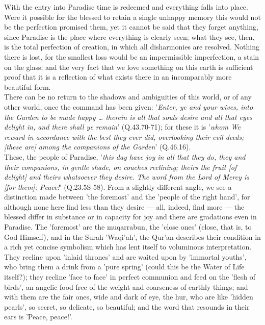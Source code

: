 \documentclass[11pt, b5paper, twoside]{book}
\begin{document}
With the entry into Paradise time is redeemed and everything falls into place. Were it possible for 
the blessed to retain a single unhappy memory this would not be the perfection promised them, yet it 
cannot be said that they forget anything, since Paradise is the place where everything is clearly 
seen; what they see, then, is the total perfection of creation, in which all disharmonies are 
resolved. Nothing there is lost, for the smallest loss would be an impermissible imperfection, a 
stain on the glass; and the very fact that we love something on this earth is sufficient proof that 
it is a reflection of what exists there in an incomparably more beautiful form. \\

There can be no return to the shadows and ambiguities of this world, or of any other world, once the 
command has been given: '\emph{Enter, ye and your wives, into the Garden to be made happy \ldots{} therein is 
all that souls desire and all that eyes delight in, and there shall ye remain}' (Q.43.70-71); for 
these it is '\emph{whom We reward in accordance with the best they ever did, overlooking their evil deeds; 
[these are] among the companions of the Garden}' (Q.46.16). \\

These, the people of Paradise, '\emph{this day have joy in all that they do, they and their companions, in 
gentle shade, on couches reclining; theirs the fruit [of delight] and theirs whatsoever they desire. 
The word from the Lord of Mercy is [for them]: Peace!}' (Q.23.5S-58). From a slightly different angle, 
we see a distinction made between 'the foremost' and the 'people of the right hand', for although 
none here find less than they desire --- all, indeed, find more --- the blessed differ in substance or in 
capacity for joy and there are gradations even in Paradise. The 'foremost' are the muqarrabun, the 
'close ones' (close, that is, to God Himself), and in the Surah 'Waqi'ah', the Qur'an describes their 
condition in a rich yet concise symbolism which has lent itself to voluminous interpretation. They 
recline upon 'inlaid thrones' and are waited upon by 'immortal youths', who bring them a drink from a 
'pure spring' (could this be the Water of Life itself?); they recline 'face to face' in perfect 
communion and feed on the 'flesh of birds', an angelic food free of the weight and coarseness of 
earthly things; and with them are the fair ones, wide and dark of eye, the hur, who are like 'hidden 
pearls', so secret, so delicate, so beautiful; and the word that resounds in their ears is 'Peace, 
peace!'. \\
\end{document}
